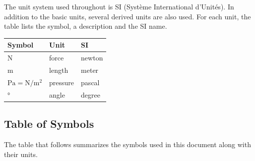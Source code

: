 \documentclass[12pt]{article}
\renewcommand{\arraystretch}{1}
\begin{document}
The unit system used throughout is SI (Syst\`{e}me International d'Unit\'{e}s). 
In
 addition to the basic units, several derived units are also used. For each 
 unit, the table
 lists the symbol, a description and the SI name.
\newline

\renewcommand{\arraystretch}{1.2}
\setlength{\tabcolsep}{20pt}
\begin{tabular}{  l  l  l  }
\hline
\textbf{Symbol} & \textbf{Unit} & \textbf{SI} \\
\hline
\si{\newton} & force & newton \\
\si{\meter} & length & meter \\
$\si{\pascal}=\si{\newton\per\square\meter}$ & pressure & pascal \\
\si{\degree} & angle & degree  \\
\hline
\end{tabular}
\renewcommand{\arraystretch}{1}



\subsection{Table of Symbols}


The table that follows summarizes the symbols used in this document along with 
their units. 
\end{document}
